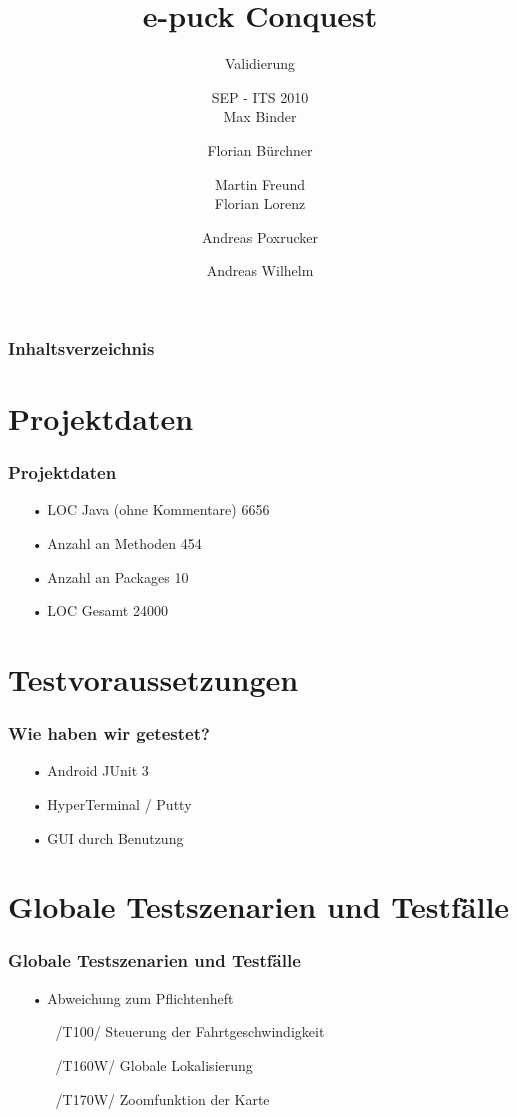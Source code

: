 \documentclass[xcolor=dvipsnames]{beamer}
\title[Validierung] %
{e-puck Conquest}
\subtitle
{Validierung}
\author[Binder, Bürchner, Freund, Lorenz, Poxrucker, Wilhelm] %
{SEP - ITS 2010 \\ Max Binder \and Florian Bürchner \and Martin Freund
	\\ Florian Lorenz \and Andreas Poxrucker \and Andreas Wilhelm}
\institute[Universität Passau] %
{
  Fakultät für Informatik und Mathematik\\
  Universität Passau}
\begin{document}
\lstset{language=Java, basicstyle=\footnotesize, tabsize=2}

\begin{frame}
  \titlepage
\end{frame}

\begin{frame}
  \frametitle{Inhaltsverzeichnis}
  \tableofcontents
\end{frame}	

\section{Projektdaten}
		\begin{frame}
		\frametitle{Projektdaten}
   			\begin{itemize}
				\item[•]LOC Java (ohne Kommentare) 6656
				\item[•]Anzahl an Methoden 454
				\item[•]Anzahl an Packages 10
				\item[•]LOC Gesamt 24000
			\end{itemize}			
		\end{frame}

		
\section{Testvoraussetzungen}
		\begin{frame}
		\frametitle{Wie haben wir getestet?}
   			\begin{itemize}
				\item[•]Android JUnit 3 
				\item[•]HyperTerminal / Putty
				\item[•]GUI durch Benutzung
			\end{itemize}			
		\end{frame}

\section{Globale Testszenarien und Testfälle}
	\begin{frame}
	\frametitle{Globale Testszenarien und Testfälle}
		\begin{itemize}
			\item[•]Abweichung zum Pflichtenheft
			\begin{itemize}
				\item[/T100/]Steuerung der Fahrtgeschwindigkeit
				\item[/T160W/]Globale Lokalisierung
				\item[/T170W/]Zoomfunktion der Karte
            \end{itemize}
		\end{itemize}
	\end{frame}
	
\end{document}
